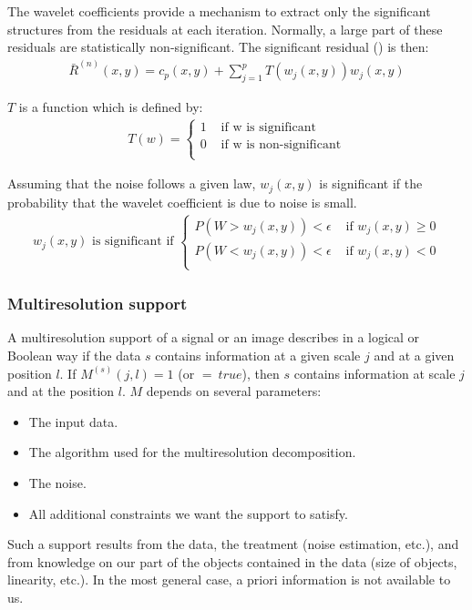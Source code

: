 \documentclass[11pt,a4paper]{article}
\begin{document}
The wavelet coefficients provide a mechanism to extract only the significant 
structures from the residuals 
at each iteration. Normally, a large part of
these residuals are statistically non-significant. 
The significant residual (\cite{starck:mur94_1,starck:sta94_1}) is then:
\begin{eqnarray}
\bar{R}^{(n)}(x,y) = c_{p}(x,y) + \sum_{j=1}^{p} T(w_j(x,y)) w_j(x,y)
\label{eq_resi}
\end{eqnarray}
 
\noindent $T$ is a function which is defined by:
\begin{eqnarray}
T(w) = \left\{
  \begin{array}{ll}
  1 & \mbox{ if w is significant} \\
  0 & \mbox{ if w is non-significant} \\
  \end{array}
  \right.
\end{eqnarray}
 
Assuming that the noise follows a given law,  
 $w_j(x,y)$ is significant if the probability that the wavelet coefficient
is due to noise is small. 
\begin{eqnarray}
w_j(x,y) \mbox{ is significant if } \left\{ \begin{array}{ll}
  P(W > w_j(x,y)) < \epsilon & \mbox{ if }   w_j(x,y) \geq 0 \\
  P(W < w_j(x,y)) < \epsilon & \mbox{ if }   w_j(x,y) < 0 \\
  \end{array}
  \right.
\end{eqnarray}

\subsubsection{Multiresolution support}
A multiresolution support of a signal or an image describes in a
logical or Boolean way if the data $s$ contains information at a 
given scale $j$ and at a given position $l$.
If $M^{(s)}(j,l) = 1$ (or $= \ true$), then $s$ contains information 
at 
scale $j$ and at the position $l$.
$M$ depends on several parameters:
\begin{itemize}
\item The input data.
\item The algorithm used for the multiresolution decomposition.
\item The noise.
\item All additional constraints we want the support to satisfy.
\end{itemize}
Such a support results from the data, the treatment (noise
estimation, etc.), and from knowledge on our part of the objects 
contained
in the data (size of objects, linearity, etc.). In the most general 
case, 
a priori information is not available to us.
\end{document}
